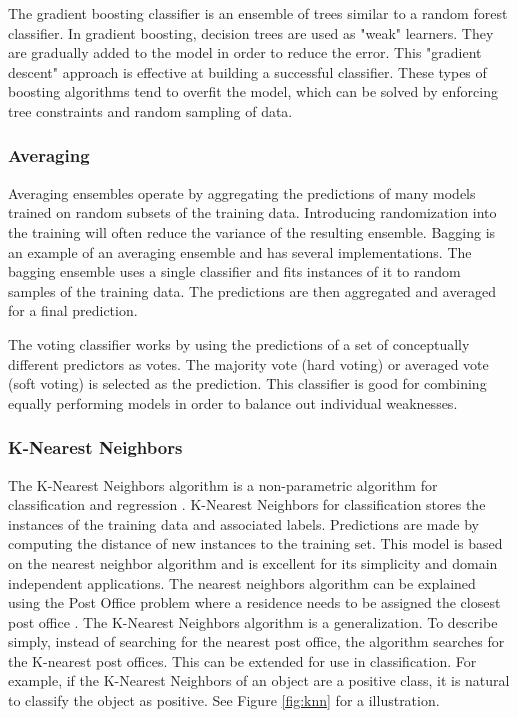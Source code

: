 \par
The gradient boosting classifier is an ensemble of trees similar to a random forest classifier.
In gradient boosting, decision trees are used as "weak" learners.
They are gradually added to the model in order to reduce the error.
This "gradient descent" approach is effective at building a successful classifier.
These types of boosting algorithms tend to overfit the model, which can be solved by enforcing tree constraints and random sampling of data.


\subsubsection{Averaging}
Averaging ensembles operate by aggregating the predictions of many models trained on random subsets of the training data.
Introducing randomization into the training will often reduce the variance of the resulting ensemble.
Bagging is an example of an averaging ensemble and has several implementations.
The bagging ensemble uses a single classifier and fits instances of it to random samples of the training data.
The predictions are then aggregated and averaged for a final prediction.

The voting classifier works by using the predictions of a set of conceptually different predictors as votes.
The majority vote (hard voting) or averaged vote (soft voting) is selected as the prediction.
This classifier is good for combining equally performing models in order to balance out individual weaknesses.

\subsubsection{K-Nearest Neighbors}
The K-Nearest Neighbors algorithm is a non-parametric algorithm for classification and regression \cite{altman1992introduction}.
K-Nearest Neighbors for classification stores the instances of the training data and associated labels.
Predictions are made by computing the distance of new instances to the training set.
This model is based on the nearest neighbor algorithm and is excellent for its simplicity and domain independent applications.
The nearest neighbors algorithm can be explained using the Post Office problem where a residence needs to be assigned the closest post office \cite{knuth1997art}.
The K-Nearest Neighbors algorithm is a generalization.
To describe simply, instead of searching for the nearest post office, the algorithm searches for the K-nearest post offices.
This can be extended for use in classification.
For example, if the K-Nearest Neighbors of an object are a positive class, it is natural to classify the object as positive.
See Figure \ref{fig:knn} for a illustration.

